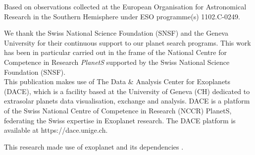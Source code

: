 \documentclass[fleqn,usenatbib]{mnras}
\begin{document}
Based on observations collected at the European Organisation for Astronomical Research in the Southern Hemisphere under ESO programme(s) 1102.C-0249.

We thank the Swiss National Science Foundation (SNSF) and the Geneva University for their continuous support to our planet search programs. This work has been in particular carried out in the frame of the National Centre for Competence in Research {\it PlanetS} supported by the Swiss National Science Foundation (SNSF).\\ %

This publication makes use of The Data & Analysis Center for Exoplanets (DACE), which is a facility based at the University of Geneva (CH) dedicated to extrasolar planets data visualisation, exchange and analysis. DACE is a platform of the Swiss National Centre of Competence in Research (NCCR) PlanetS, federating the Swiss expertise in Exoplanet research. The DACE platform is available at https://dace.unige.ch.

This research made use of \textsf{exoplanet} \citep{exoplanet} and its
dependencies \citep{exoplanet:agol19, exoplanet:astropy13, exoplanet:astropy18,
exoplanet:exoplanet, exoplanet:foremanmackey17, exoplanet:foremanmackey18,
exoplanet:luger18, exoplanet:pymc3, exoplanet:theano}.











\appendix
\end{document}
